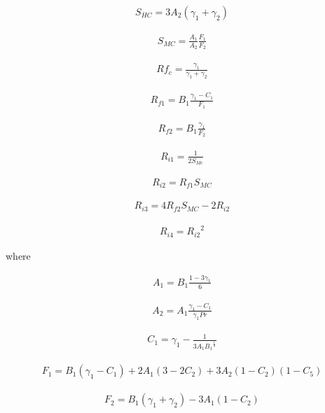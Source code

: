 \begin{eqnarray}S_{HC}=3A_2(\gamma_1+\gamma_2)\end{eqnarray}

\begin{eqnarray}S_{MC}=\frac{A_1}{A_2}\frac{F_1}{F_2}\end{eqnarray}

\begin{eqnarray}Rf_c=\frac{\gamma_1}{\gamma_1+\gamma_2}\end{eqnarray}

\begin{eqnarray}R_{f1}=B_1\frac{\gamma_1-C_1}{F_1}\end{eqnarray}

\begin{eqnarray}R_{f2}=B_1\frac{\gamma_1}{F_2}\end{eqnarray}

\begin{eqnarray}R_{i1}=\frac{1}{2S_{Mc}}\end{eqnarray}

\begin{eqnarray}R_{i2}=R_{f1}S_{MC}\end{eqnarray}

\begin{eqnarray}R_{i3}=4R_{f2}S_{MC}-2R_{i2}\end{eqnarray}

\begin{eqnarray}R_{i4}={R_{i2}}^2\end{eqnarray}

where

\begin{eqnarray}A_1=B_1\frac{1-3\gamma_1}{6}\end{eqnarray}

\begin{eqnarray}A_2=A_1\frac{\gamma_1-C_1}{\gamma_1 Pr}\end{eqnarray}

\begin{eqnarray}C_1=\gamma_1-\frac{1}{3A_1{B_1}^{\frac{1}{3}}}\end{eqnarray}

\begin{eqnarray}F_1=B_1(\gamma_1-C_1)+2A_1(3-2C_2)+3A_2(1-C_2)(1-C_5)\end{eqnarray}

\begin{eqnarray}F_2=B_1(\gamma_1+\gamma_2)-3A_1(1-C_2)\end{eqnarray}

